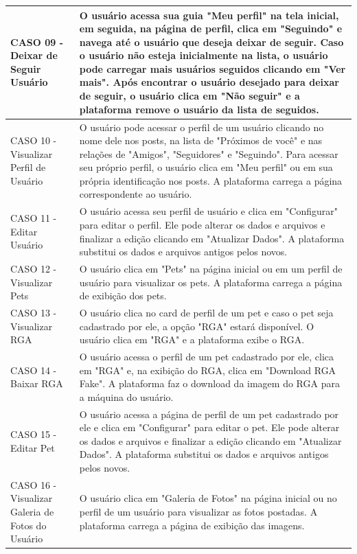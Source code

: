 \begin{longtable}{|p{4cm}|p{9cm}|}
    \hline
    CASO 09 - Deixar de Seguir Usuário & O usuário acessa sua guia "Meu perfil" na tela inicial, em seguida, na página de perfil, clica em "Seguindo" e navega até o usuário que deseja deixar de seguir. Caso o usuário não esteja inicialmente na lista, o usuário pode carregar mais usuários seguidos clicando em "Ver mais". Após encontrar o usuário desejado para deixar de seguir, o usuário clica em "Não seguir" e a plataforma remove o usuário da lista de seguidos.\\
    \hline
    CASO 10 - Visualizar Perfil de Usuário & O usuário pode acessar o perfil de um usuário clicando no nome dele nos posts, na lista de "Próximos de você" e nas relações de "Amigos", "Seguidores" e "Seguindo". Para acessar seu próprio perfil, o usuário clica em "Meu perfil" ou em sua própria identificação nos posts. A plataforma carrega a página correspondente ao usuário.\\
    \hline
    CASO 11 - Editar Usuário & O usuário acessa seu perfil de usuário e clica em "Configurar" para editar o perfil. Ele pode alterar os dados e arquivos e finalizar a edição clicando em "Atualizar Dados". A plataforma substitui os dados e arquivos antigos pelos novos. \\
    \hline
    CASO 12 - Visualizar Pets & O usuário clica em "Pets" na página inicial ou em um perfil de usuário para visualizar os pets. A plataforma carrega a página de exibição dos pets.\\
    \hline
    CASO 13 - Visualizar RGA & O usuário clica no card de perfil de um pet e caso o pet seja cadastrado por ele, a opção "RGA" estará disponível. O usuário clica em "RGA" e a plataforma exibe o RGA.\\
    \hline
    CASO 14 - Baixar RGA & O usuário acessa o perfil de um pet cadastrado por ele, clica em "RGA" e, na exibição do RGA, clica em "Download RGA Fake". A plataforma faz o download da imagem do RGA para a máquina do usuário.\\
    \hline
    CASO 15 - Editar Pet & O usuário acessa a página de perfil de um pet cadastrado por ele e clica em "Configurar" para editar o pet. Ele pode alterar os dados e arquivos e finalizar a edição clicando em "Atualizar Dados". A plataforma substitui os dados e arquivos antigos pelos novos.\\
    \hline
    CASO 16 - Visualizar Galeria de Fotos do Usuário & O usuário clica em "Galeria de Fotos" na página inicial ou no perfil de um usuário para visualizar as fotos postadas. A plataforma carrega a página de exibição das imagens.\\

\end{longtable}
